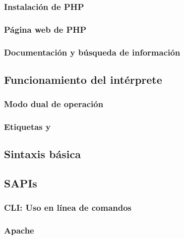 \documentclass[a4paper,11pt,spanish]{sphinxmanual}
\begin{document}
\subsubsection{Instalación de PHP}
\label{\detokenize{contenidos:id54}}

\subsubsection{Página web de PHP}
\label{\detokenize{contenidos:id55}}

\subsubsection{Documentación y búsqueda de información}
\label{\detokenize{contenidos:id56}}

\subsection{Funcionamiento del intérprete}
\label{\detokenize{contenidos:id57}}

\subsubsection{Modo dual de operación}
\label{\detokenize{contenidos:id58}}

\subsubsection{Etiquetas  y }
\label{\detokenize{contenidos:id59}}

\subsection{Sintaxis básica}
\label{\detokenize{contenidos:id60}}

\subsection{SAPIs}
\label{\detokenize{contenidos:id61}}

\subsubsection{CLI: Uso en línea de comandos}
\label{\detokenize{contenidos:id62}}

\subsubsection{Apache}
\label{\detokenize{contenidos:id63}}
\end{document}
